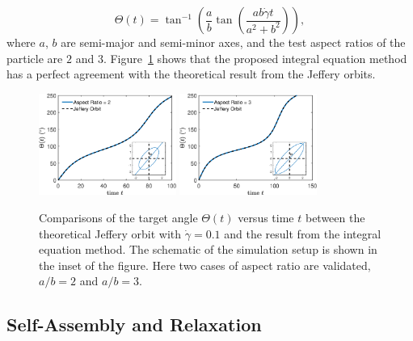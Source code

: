 \documentclass[lineno]{jfm}
\begin{document}
\begin{equation}
\Theta(t) = \tan^{-1}\left(\frac{a}{b}\tan \left(\frac{ab \dot\gamma t}{a^2+b^2}\right)\right),
\end{equation}
%
where $a$, $b$ are semi-major and semi-minor axes, and the test aspect ratios of the particle are $2$ and $3$. Figure~\ref{figure1} shows that the proposed integral equation method has a perfect agreement with the theoretical result from the Jeffery orbits.


\begin{figure}
\centering
\includegraphics[width=0.4\textwidth]{JefferyOrbit2.eps}
\includegraphics[width=0.4\textwidth]{JefferyOrbit3.eps}
  \caption{Comparisons of the target angle $\Theta(t)$ versus time $t$ between the theoretical Jeffery orbit with $\dot\gamma=0.1$ and the result from the integral equation method. The schematic of the simulation setup is shown in the inset of the figure. Here two cases of aspect ratio are validated, $a/b = 2$ and $a/b=3$.
  }
    \label{figure1}
\end{figure}

\subsection{Self-Assembly and Relaxation}
\end{document}
